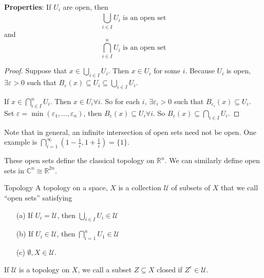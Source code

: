 \documentclass{report}
\begin{document}
\textbf{Properties}: If $U_{i}$ are open, then 
    \begin{equation*}
        \bigcup_{i \in I}^{} U_{i} \text{ is an open set}
    \end{equation*}
and
    \begin{equation*}
        \bigcap_{i \in I}^{n} U_{i} \text{ is an open set}
    \end{equation*}
        \begin{proof}
            Suppose that $x \in \bigcup_{i \in I}^{}  U_{i}$. Then $x \in U_{i}$ for some $i$. Because $U_{i}$ is open, $\exists \varepsilon > 0$ such that $B_{\varepsilon}(x) \subseteq U_{i} \subseteq \bigcup_{i \in I}^{} U_{i}$.

            If $x \in \bigcap_{i \in I}^{n} U_{i}$. Then $x \in U_{i} \forall i$. So for each $i$, $\exists \varepsilon_{i} > 0$ such that $B_{\varepsilon_{i}}(x) \subseteq U_{i}$. Set $\varepsilon = \min(\varepsilon_{1}, \ldots , \varepsilon_{n})$, then $B_{\varepsilon}(x) \subseteq U_{i} \forall i$. So $B_{\varepsilon}(x) \subseteq \bigcap_{i \in I}^{} U_{i}$.
        \end{proof}

Note that in general, an infinite intersection of open sets need not be open. One example is $\bigcap_{i = 1}^{\infty} (1 - \frac{1}{i}, 1 + \frac{1}{i}) = \{1\}$.

These open sets define the classical topology on $\mathbb{R}^{n}$. We can similarly define open sets in $\mathbb{C}^{n} \cong \mathbb{R}^{2n}$.

\begin{definition}{Topology}
    A topology on a space, $X$ is a collection $\mathcal{U}$ of subsets of $X$ that we call ``open sets'' satisfying 
        \begin{itemize}
            \item [(a)] If $U_{i} = \mathcal{U}$, then $\bigcup_{i \in I}^{} U_{i} \in \mathcal{U}$

            \item [(b)] If $U_{i} \in \mathcal{U}$, then $\bigcap_{i = 1}^{n} U_{1} \in \mathcal{U}$

            \item [(c)] $\emptyset, X \in \mathcal{U}$. 
        \end{itemize}
\end{definition}

\begin{definition}{}
    If $\mathcal{U}$ is a topology on $X$, we call a subset $Z \subseteq X$ closed if $Z^{c} \in \mathcal{U}$.
\end{definition}
\end{document}
